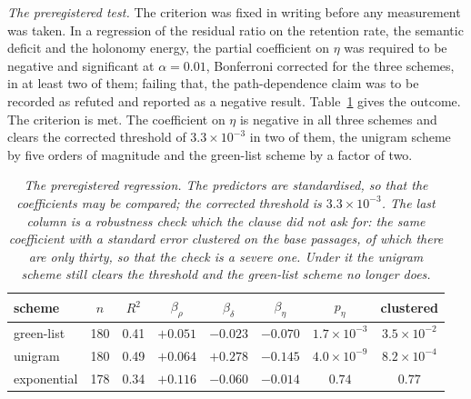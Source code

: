 \documentclass{article}
\theoremstyle{plain}
\theoremstyle{definition}
\numberwithin{equation}{section}
\begin{document}
\medskip
\noindent\emph{The preregistered test.}
The criterion was fixed in writing before any measurement was taken. In
a regression of the residual ratio on the retention rate, the semantic
deficit and the holonomy energy, the partial coefficient on $\eta$ was
required to be negative and significant at $\alpha = 0.01$, Bonferroni
corrected for the three schemes, in at least two of them; failing that,
the path-dependence claim was to be recorded as refuted and reported as
a negative result. Table~\ref{tab:resultd} gives the outcome. The
criterion is met. The coefficient on $\eta$ is negative in all three
schemes and clears the corrected threshold of $3.3\times10^{-3}$ in two
of them, the unigram scheme by five orders of magnitude and the
green-list scheme by a factor of two.

\begin{table}[t]
\centering
\small
\begin{tabular}{lccccccc}
\toprule
scheme & $n$ & $R^2$ & $\beta_\rho$ & $\beta_\delta$ & $\beta_\eta$ &
$p_\eta$ & clustered\\
\midrule
green-list  & 180 & 0.41 & $+0.051$ & $-0.023$ & $-0.070$ &
  $1.7\times10^{-3}$ & $3.5\times10^{-2}$\\
unigram     & 180 & 0.49 & $+0.064$ & $+0.278$ & $-0.145$ &
  $4.0\times10^{-9}$ & $8.2\times10^{-4}$\\
exponential & 178 & 0.34 & $+0.116$ & $-0.060$ & $-0.014$ &
  $0.74$ & $0.77$\\
\bottomrule
\end{tabular}
\caption{\emph{The preregistered regression. The predictors are
standardised, so that the coefficients may be compared; the corrected
threshold is $3.3\times10^{-3}$. The last column is a robustness check
which the clause did not ask for: the same coefficient with a standard
error clustered on the base passages, of which there are only thirty, so
that the check is a severe one. Under it the unigram scheme still clears
the threshold and the green-list scheme no longer does.}}
\label{tab:resultd}
\end{table}
\end{document}
